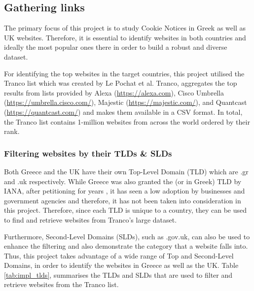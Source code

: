 \documentclass[../main.tex]{subfiles}
\begin{document}
\subsection{Gathering links}
The primary focus of this project is to study Cookie Notices in Greek as well as UK websites. Therefore, it is essential to identify websites in both countries and ideally the most popular ones there in order to build a robust and diverse dataset.

For identifying the top websites in the target countries, this project utilised the Tranco list which was created by Le Pochat et al. \cite{LePochat2019} Tranco, aggregates the top results from lists provided by Alexa (\url{https://alexa.com}), Cisco Umbrella (\url{https://umbrella.cisco.com/}), Majestic (\url{https://majestic.com/}), and Quantcast (\url{https://quantcast.com/}) and makes them available in a CSV format. In total, the Tranco list contains 1-million websites from across the world ordered by their rank.

\subsubsection{Filtering websites by their TLDs \& SLDs}
Both Greece and the UK have their own Top-Level Domain (TLD) which are .gr and .uk respectively. While Greece was also granted the  (or  in Greek) TLD by IANA, after petitioning for years \cite{iana_el}, it has seen a low adoption by businesses and government agencies and therefore, it has not been taken into consideration in this project. Therefore, since each TLD is unique to a country, they can be used to find and retrieve websites from Tranco’s large dataset. 

Furthermore, Second-Level Domains (SLDs), such as .gov.uk, can also be used to enhance the filtering and also demonstrate the category that a website falls into. Thus, this project takes advantage of a wide range of Top and Second-Level Domains, in order to identify the websites in Greece as well as the UK. Table \ref{tab:impl_tlds}, summarises the TLDs and SLDs that are used to filter and retrieve websites from the Tranco list.
\end{document}
